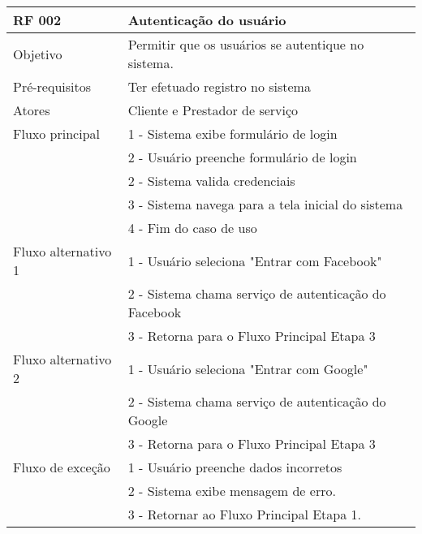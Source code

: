 \documentclass{article}
\begin{document}
\begin{table}[h!]
  \begin{center}
    \label{tab:table4}
    \begin{tabular}{|l|l|}
      \hline
      \textbf{RF 002} & \textbf{Autenticação do usuário}\\
      \hline
      Objetivo          & Permitir que os usuários se autentique no sistema. \\
      \hline
      Pré-requisitos    & Ter efetuado registro no sistema \\
      \hline
      Atores            & Cliente e Prestador de serviço \\
      \hline
      Fluxo principal   & 1 - Sistema exibe formulário de login \\
                        & 2 - Usuário preenche formulário de login \\
                        & 2 - Sistema valida credenciais \\
                        & 3 - Sistema navega para a tela inicial do       sistema \\
                        & 4 - Fim do caso de uso \\
      \hline
      Fluxo alternativo 1 & 1 - Usuário seleciona "Entrar com Facebook" \\
                          & 2 - Sistema chama serviço de autenticação do Facebook \\
                          & 3 - Retorna para o Fluxo Principal Etapa 3 \\
      \hline
      Fluxo alternativo 2 & 1 - Usuário seleciona "Entrar com Google" \\
                          & 2 - Sistema chama serviço de autenticação do Google \\
                          & 3 - Retorna para o Fluxo Principal Etapa 3 \\
      \hline
      Fluxo de exceção & 1 - Usuário preenche dados incorretos \\
                       & 2 - Sistema exibe mensagem de erro. \\
                       & 3 - Retornar ao Fluxo Principal Etapa 1. \\
      \hline
    \end{tabular}
  \end{center}
\end{table}
\end{document}
